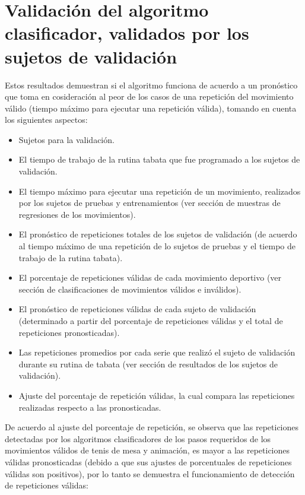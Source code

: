 \section{Validaci\'on del algoritmo clasificador,   validados por los sujetos de validaci\'on} \label{res:valResults}
Estos resultados demuestran si el algoritmo funciona de acuerdo a un pron\'ostico que toma en cosideraci\'on al peor de los casos de una repetici\'on del movimiento v\'alido (tiempo m\'aximo para ejecutar una repetici\'on v\'alida), tomando en cuenta los siguientes aspectos:
\begin{itemize}
\item Sujetos para la validaci\'on.
\item El tiempo de trabajo de la rutina tabata que fue programado a los sujetos de validaci\'on.
\item El tiempo m\'aximo para ejecutar una repetici\'on de un movimiento, realizados por los sujetos de pruebas y entrenamientos (ver secci\'on de muestras de regresiones de los movimientos).
\item El pron\'ostico de repeticiones totales de los sujetos de validaci\'on (de acuerdo al tiempo m\'aximo de una repetici\'on de lo sujetos de pruebas y el tiempo de trabajo de la rutina tabata).
\item El porcentaje de repeticiones v\'alidas de cada movimiento deportivo (ver secci\'on de clasificaciones de movimientos v\'alidos e inv\'alidos).
\item El pron\'ostico de repeticiones v\'alidas de cada sujeto de validaci\'on (determinado a partir del porcentaje de repeticiones v\'alidas y el total de repeticiones pronosticadas).
\item Las repeticiones promedios por cada serie que realiz\'o el sujeto de validaci\'on durante su rutina de tabata (ver secci\'on de resultados de los sujetos de validaci\'on).
\item  Ajuste del porcentaje de repetici\'on v\'alidas, la cual compara las repeticiones realizadas respecto a las pronosticadas.
\end{itemize}
\medbreak
De acuerdo al ajuste del porcentaje de repetici\'on, se observa que las repeticiones detectadas por los algoritmos clasificadores de los pasos requeridos de los movimientos v\'alidos de tenis de mesa y animaci\'on, es mayor a las repeticiones v\'alidas pronosticadas (debido a que sus ajustes de porcentuales de repeticiones v\'alidas son positivos), por lo tanto se demuestra el funcionamiento de detecci\'on de repeticiones v\'alidas:
